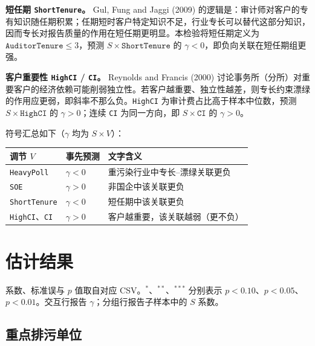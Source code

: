 \documentclass[11pt]{article}
\begin{document}
\textbf{短任期 \texttt{ShortTenure}。}
Gul, Fung and Jaggi (2009) 的逻辑是：审计师对客户的专有知识随任期积累；任期短时客户特定知识不足，行业专长可以替代这部分知识，因而专长对报告质量的作用在短任期更明显。本检验将短任期定义为 \(\texttt{AuditorTenure}\le 3\)，预测 \(S\times\texttt{ShortTenure}\) 的 \(\gamma<0\)，即负向关联在短任期组更强。

\textbf{客户重要性 \texttt{HighCI} / \texttt{CI}。}
Reynolds and Francis (2000) 讨论事务所（分所）对重要客户的经济依赖可能削弱独立性。若客户越重要、独立性越差，则专长约束漂绿的作用应更弱，即斜率不那么负。\texttt{HighCI} 为审计费占比高于样本中位数，预测 \(S\times\texttt{HighCI}\) 的 \(\gamma>0\)；连续 \texttt{CI} 为同一方向，即 \(S\times\texttt{CI}\) 的 \(\gamma>0\)。

符号汇总如下（\(\gamma\) 均为 \(S\times V\)）：

\begin{center}
\begin{tabular}{lll}
\toprule
调节 \(V\) & 事先预测 & 文字含义 \\
\midrule
\texttt{HeavyPoll} & \(\gamma<0\) & 重污染行业中专长--漂绿关联更负 \\
\texttt{SOE} & \(\gamma>0\) & 非国企中该关联更负 \\
\texttt{ShortTenure} & \(\gamma<0\) & 短任期中该关联更负 \\
\texttt{HighCI}、\texttt{CI} & \(\gamma>0\) & 客户越重要，该关联越弱（更不负） \\
\bottomrule
\end{tabular}
\end{center}

\section{估计结果}

系数、标准误与 \(p\) 值取自对应 CSV。\(^{*}\)、\(^{**}\)、\(^{***}\) 分别表示 \(p<0.10\)、\(p<0.05\)、\(p<0.01\)。交互行报告 \(\gamma\)；分组行报告子样本中的 \(S\) 系数。

\subsection{重点排污单位}
\end{document}
